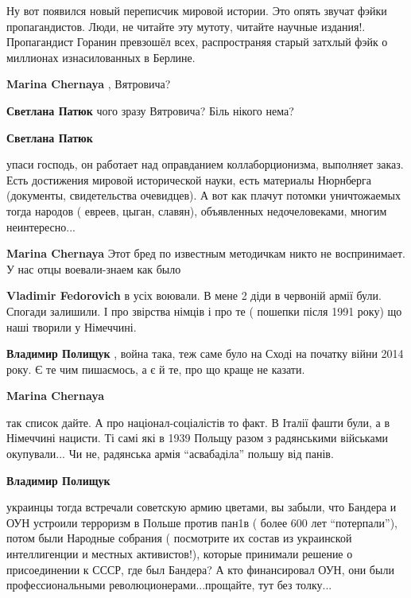 \begin{itemize}
Ну вот появился новый переписчик мировой истории. Это опять звучат фэйки
пропагандистов. Люди, не читайте эту мутоту, читайте научные
издания!. Пропагандист Горанин превзошёл всех, распространяя старый затхлый фэйк
о миллионах изнасилованных в Берлине.

\begin{itemize} %
\textbf{Marina Chernaya} , Вятровича?

\begin{itemize} %
\textbf{Светлана Патюк} чого зразу Вятровича? Біль нікого нема?

\textbf{Светлана Патюк} 

упаси господь, он работает над оправданием коллаборционизма, выполняет заказ.
Есть достижения мировой исторической науки, есть материалы Нюрнберга
(документы, свидетельства очевидцев). А вот как плачут потомки уничтожаемых
тогда народов ( евреев, цыган, славян), объявленных недочеловеками, многим
неинтересно...

\end{itemize} %

\textbf{Marina Chernaya} Этот бред по известным методичкам никто не воспринимает. У нас отцы воевали-знаем как было

\begin{itemize} %
\textbf{Vladimir Fedorovich} в усіх воювали. В мене 2 діди в червоній армії були. Спогади залишили. І про звірства німців і про те ( пошепки після 1991 року) що наші творили у Німеччині.

\textbf{Владимир Полищук} , война така, теж саме було на Сході на початку війни 2014 року. Є те чим пишаємось, а є й те, про що краще не казати.
\end{itemize} %

\textbf{Marina Chernaya} 

так список дайте. А про націонал-соціалістів то факт. В Італії фашти були, а в
Німеччині нацисти. Ті самі які в 1939 Польщу разом з радянськими військами
окупували... Чи не, радянська армія \enquote{асвабаділа} польшу від панів.

\begin{itemize} %
\textbf{Владимир Полищук} 

украинцы тогда встречали советскую армию цветами, вы забыли, что Бандера и ОУН
устроили терроризм в Польше против пан1в ( более 600 лет \enquote{потерпали}), потом
были Народные собрания ( посмотрите их состав из украинской интеллигенции и
местных активистов!), которые принимали решение о присоединении к СССР, где был
Бандера? А кто финансировал ОУН, они были профессиональными
революционерами...прощайте, тут без толку...


\end{itemize}
\end{itemize}
\end{itemize}

